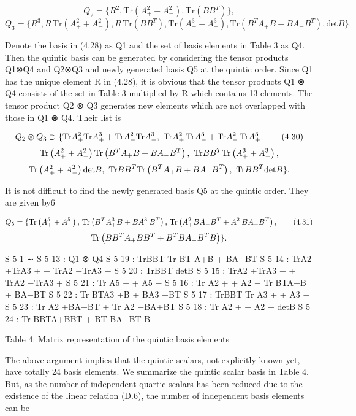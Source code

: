 \documentclass{article}
\begin{document}
$$Q_{2}=\{R^{2},\text{Tr}\left(A_{+}^{2}+A_{-}^{2}\right),\text{Tr}(BB^{T})\},$$ $$Q_{3}=\{R^{3},R\,\text{Tr}\left(A_{+}^{2}+A_{-}^{2}\right),R\,\text{Tr}(BB^{T}),\text{Tr}\left(A_{+}^{3}+A_{-}^{3}\right),\text{Tr}\left(B^{T}A_{+}B+BA_{-}B^{T}\right),\text{det}B\}.\tag{4.29}$$

Denote the basis in (4.28) as Q1 and the set of basis elements in Table 3 as Q4. Then the quintic basis can be generated by considering the tensor products Q1⊗Q4 and Q2⊗Q3 and newly generated basis Q5 at the quintic order. Since Q1 has the unique element R in (4.28), it is obvious that the tensor products Q1 ⊗ Q4 consists of the set in Table 3 multiplied by R which contains 13 elements. The tensor product Q2 ⊗ Q3 generates new elements which are not overlapped with those in Q1 ⊗ Q4. Their list is

$$Q_{2}\otimes Q_{3}\supset\{{\rm Tr}A_{+}^{2}{\rm Tr}A_{+}^{3}+{\rm Tr}A_{-}^{2}{\rm Tr}A_{-}^{3},\ {\rm Tr}A_{+}^{2}\,{\rm Tr}A_{-}^{3}+{\rm Tr}A_{-}^{2}\,{\rm Tr}A_{+}^{3},\tag{4.30}$$ $${\rm Tr}\left(A_{+}^{2}+A_{-}^{2}\right){\rm Tr}\left(B^{T}A_{+}B+BA_{-}B^{T}\right),\ {\rm Tr}BB^{T}{\rm Tr}\left(A_{+}^{3}+A_{-}^{3}\right),$$ $${\rm Tr}\left(A_{+}^{2}+A_{-}^{2}\right){\rm det}B,\ {\rm Tr}BB^{T}{\rm Tr}\left(B^{T}A_{+}B+BA_{-}B^{T}\right),\ {\rm Tr}BB^{T}{\rm det}B\}.$$

It is not difficult to find the newly generated basis Q5 at the quintic order. They are given by6

$$Q_{5}=\{{\rm Tr}\left(A_{+}^{5}+A_{-}^{5}\right),\,{\rm Tr}\left(B^{T}A_{+}^{3}B+BA_{-}^{3}B^{T}\right),\,{\rm Tr}\left(A_{+}^{2}BA_{-}B^{T}+A_{-}^{2}BA_{+}B^{T}\right),\tag{4.31}$$ $${\rm Tr}\left(BB^{T}A_{+}BB^{T}+B^{T}BA_{-}B^{T}B\right)\}.$$

S 5 1 ∼ S 5 13 : Q1 ⊗ Q4 S 5 19 : TrBBT Tr BT A+B + BA−BT S 5 14 : TrA2 +TrA3 + + TrA2 −TrA3 − S 5 20 : TrBBT detB S 5 15 : TrA2 +TrA3 − + TrA2 −TrA3 + S 5 21 : Tr A5 + + A5 − S 5 16 : Tr A2 + + A2 − Tr BTA+B + BA−BT S 5 22 : Tr BTA3 +B + BA3 −BT S 5 17 : TrBBT Tr A3 + + A3 − S 5 23 : Tr A2 +BA−BT + Tr A2 −BA+BT S 5 18 : Tr A2 + + A2 − detB S 5 24 : Tr BBTA+BBT + BT BA−BT B

Table 4: Matrix representation of the quintic basis elements

The above argument implies that the quintic scalars, not explicitly known yet, have totally 24 basis elements. We summarize the quintic scalar basis in Table 4. But, as the number of independent quartic scalars has been reduced due to the existence of the linear relation (D.6), the number of independent basis elements can be
\end{document}
